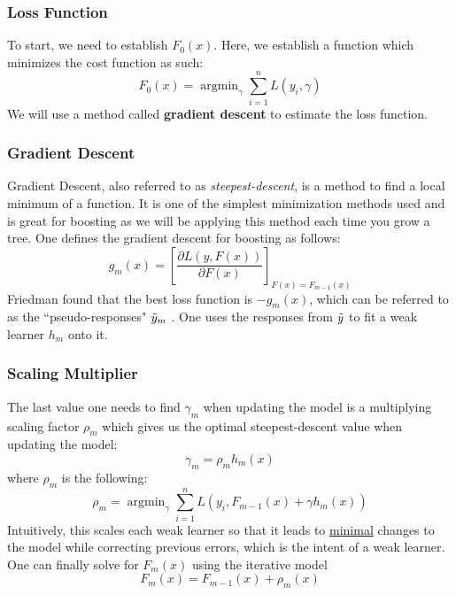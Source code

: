 \documentclass[11pt,a4paper]{report}
\DeclareMathOperator*{\argminB}{argmin}
\begin{document}
\subsubsection{Loss Function}
To start, we need to establish $F_0 (x)$.
Here, we establish a function which minimizes the cost function as such:
\begin{equation}
    F_0 (x) = \argminB_\gamma \sum_{i=1}^{n} L(y_i, \gamma)
\end{equation}
We will use a method called \textbf{gradient descent} to estimate the loss function.

\subsubsection{Gradient Descent}
Gradient Descent, also referred to as \textit{steepest-descent}, is a method to find a local minimum of a function. 
It is one of the simplest minimization methods used and is great for boosting as we will be applying this method each time you grow a tree.
One defines the gradient descent for boosting as follows:
\begin{equation}
    g_m (x) = \left[ \frac{\partial L(y,F(x))}{\partial F(x)} \right]_{F(x) = F_{m-1} (x)}
\end{equation}
Friedman found that the best loss function is $-g_m (x)$, which can be referred to as the ``pseudo-responses" $\Tilde{y}_m$ \cite{gbm}.
One uses the responses from $\Tilde{y}$ to fit a weak learner $h_m$ onto it.

\subsubsection{Scaling Multiplier}
The last value one needs to find $\gamma_m$ when updating the model is a multiplying scaling factor $\rho_m$ which gives us the optimal steepest-descent value when updating the model:
\[ \gamma_m = \rho_m h_m (x) \]
where $\rho_m$ is the following:
\begin{equation}
    \rho_m = \argminB_\gamma \sum_{i=1}^{n} L (y_i, F_{m-1} (x) + \gamma h_m (x))
\end{equation}
Intuitively, this scales each weak learner so that it leads to \underline{minimal} changes to the model while correcting previous errors, which is the intent of a weak learner.
One can finally solve for $F_m (x)$ using the iterative model
\begin{equation}
F_m (x) = F_{m-1} (x) + \rho_m (x)
\label{eq:learner}
\end{equation}
\end{document}
